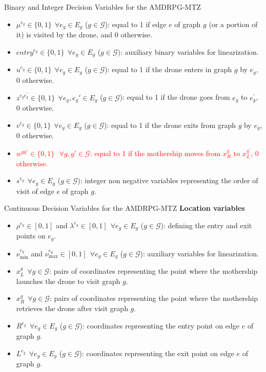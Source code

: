 \documentclass[slidestop,usepdftitle=false,10pt]{beamer}
\begin{document}
	\begin{frame}{\large Binary and Integer Decision Variables for the AMDRPG-MTZ}
	\begin{itemize}
	    \small
	    \item $\mu^{e_g} \in \{0,1\} \:\: \forall e_g \in E_g$ ($g \in \mathcal{G}$): equal to 1 if edge $e$ of graph $g$ (or a portion of it) is visited by the drone, and 0 otherwise.
        \item $entry^{e_g} \in \{0,1\} \:\: \forall e_g \in E_g$ ($g \in \mathcal{G}$): auxiliary binary variables for linearization.
        \item $u^{e_{g}} \in \{0,1\} \:\: \forall e_g \in E_g$ ($g \in \mathcal{G}$): equal to 1 if the drone enters in graph $g$ by $e_g$, 0 otherwise.
        \item $z^{e_{g}e^{'}_{g}} \in \{0,1\} \:\: \forall e_g, e_g' \in E_g$ ($g \in \mathcal{G}$): equal to 1 if the drone goes from $e_g$ to $e^{'}_{g}$, 0 otherwise.
        \item $v^{e_{g}} \in \{0,1\} \:\: \forall e_g \in E_g$ ($g \in \mathcal{G}$): equal to 1 if the drone exits from graph $g$ by $e_g$, 0 otherwise.
        \item \textcolor{red}{$w^{gg'} \in \{0,1\} \:\:\ \forall g,g' \in \mathcal{G}$: equal to 1 if the mothership moves from $x_R^g$ to $x_L^{g^'}$, 0 otherwise.}
        \item $s^{e_g} \:\: \forall e_g \in E_g$ ($g \in \mathcal{G}$): integer non negative variables representing the order of visit of edge $e$ of graph $g$.
    \end{itemize}
	\end{frame}
	
	\begin{frame}{Continuous Decision Variables for the AMDRPG-MTZ}
	\textbf{Location variables}
	\begin{itemize}
        \item $\rho^{e_g} \in [0,1]$ and $\lambda^{e_g} \in [0,1] \:\: \forall e_g \in E_g$ ($g \in \mathcal{G}$): defining the entry and exit points on $e_g$.
        \item $\nu_\text{min}^{e_g}$ and $\nu_\text{max}^{e_g} \in [0,1] \:\: \forall e_g \in E_g$ ($g \in \mathcal{G}$): auxiliary variables for linearization.
        \item $x_L^g \:\: \forall g \in \mathcal{G}$: pairs of coordinates representing the point where the mothership launches the drone to visit graph $g$.
        \item $x_R^g \:\: \forall g \in \mathcal{G}$: pairs of coordinates representing the point where the mothership retrieves the drone after visit graph $g$.
        \item $R^{e_g} \:\: \forall e_g \in E_g$ ($g \in \mathcal{G}$): coordinates representing the entry point on edge $e$ of graph $g$.
        \item $L^{e_g} \:\: \forall e_g \in E_g$ ($g \in \mathcal{G}$): coordinates representing the exit point on edge $e$ of graph $g$.
    \end{itemize}
    \end{frame}
    
\end{document}
